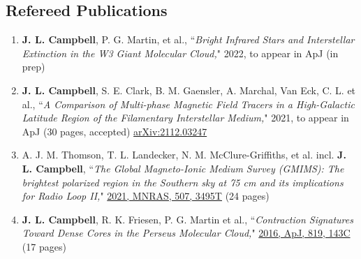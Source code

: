 \documentclass[10pt]{res} %
\begin{document}
\begin{resume}
\section{\Large Refereed Publications}
\vspace{-5pt} %
\noindent\makebox[\linewidth]{\rule{\textwidth}{0.4pt}}
\vspace{-15pt} %

\begin{enumerate}[{start=4,label=\arabic*.\addtocounter{enumi}{-2}}]
\itemsep-1em 
	\item \textbf{J. L. Campbell}, P. G. Martin, et al., ``\textit{Bright Infrared Stars and Interstellar Extinction in the W3 Giant Molecular Cloud,}" 2022, to appear in ApJ (in prep) \\
	\item \textbf{J. L. Campbell}, S. E. Clark, B. M. Gaensler, A. Marchal, Van Eck, C. L. et al., ``\textit{A Comparison of Multi-phase Magnetic Field Tracers in a High-Galactic Latitude Region of the Filamentary Interstellar Medium,}" 2021, to appear in ApJ (30 pages, accepted) \href{https://ui.adsabs.harvard.edu/abs/2021arXiv211203247C/abstract}{arXiv:2112.03247}  \\
	\item A. J. M. Thomson, T. L. Landecker, N. M. McClure-Griffiths, et al. incl. \textbf{J. L. Campbell}, ``\textit{The Global Magneto-Ionic Medium Survey (GMIMS): The brightest polarized region in the Southern sky at 75 cm and its implications for Radio Loop II,}" \href{https://ui.adsabs.harvard.edu/abs/2021arXiv210612595T/abstract}{2021, MNRAS, 507, 3495T} (24 pages) \\
	\item \textbf{J. L. Campbell}, R. K. Friesen, P. G. Martin et al., ``\textit{Contraction Signatures Toward Dense Cores in the Perseus Molecular Cloud,}" \href{https://ui.adsabs.harvard.edu/abs/2016ApJ...819..143C/abstract}{2016, ApJ, 819, 143C} (17 pages)
\end{enumerate}



\end{resume}
\end{document}
